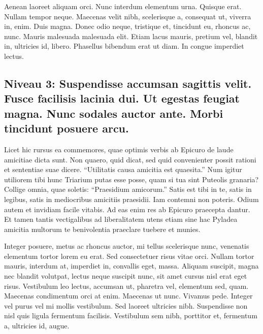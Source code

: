 \documentclass[twoside]{extreport}
\begin{document}
Aenean laoreet aliquam orci. Nunc interdum elementum urna. Quisque erat.
Nullam tempor neque. Maecenas velit nibh, scelerisque a, consequat ut,
viverra in, enim. Duis magna. Donec odio neque, tristique et, tincidunt
eu, rhoncus ac, nunc. Mauris malesuada malesuada elit. Etiam lacus
mauris, pretium vel, blandit in, ultricies id, libero. Phasellus
bibendum erat ut diam. In congue imperdiet lectus.

\hypertarget{niveau-3-suspendisse-accumsan-sagittis-velit.-fusce-facilisis-lacinia-dui.-ut-egestas-feugiat-magna.-nunc-sodales-auctor-ante.-morbi-tincidunt-posuere-arcu.}{%
\subsection*{Niveau 3: Suspendisse accumsan sagittis velit. Fusce
facilisis lacinia dui. Ut egestas feugiat magna. Nunc sodales auctor
ante. Morbi tincidunt posuere
arcu.}\label{niveau-3-suspendisse-accumsan-sagittis-velit.-fusce-facilisis-lacinia-dui.-ut-egestas-feugiat-magna.-nunc-sodales-auctor-ante.-morbi-tincidunt-posuere-arcu.}}

Licet hic rursus ea commemores, quae optimis verbis ab Epicuro de laude
amicitiae dicta sunt. Non quaero, quid dicat, sed quid convenienter
possit rationi et sententiae suae dicere. ``Utilitatis causa amicitia
est quaesita.'' Num igitur utiliorem tibi hunc Triarium putas esse
posse, quam si tua sint Puteolis granaria? Collige omnia, quae soletis:
``Praesidium amicorum.'' Satis est tibi in te, satis in legibus, satis
in mediocribus amicitiis praesidii. Iam contemni non poteris. Odium
autem et invidiam facile vitabis. Ad eas enim res ab Epicuro praecepta
dantur. Et tamen tantis vectigalibus ad liberalitatem utens etiam sine
hac Pyladea amicitia multorum te benivolentia praeclare tuebere et
munies.

Integer posuere, metus ac rhoncus auctor, mi tellus scelerisque nunc,
venenatis elementum tortor lorem eu erat. Sed consectetuer risus vitae
orci. Nullam tortor mauris, interdum at, imperdiet in, convallis eget,
massa. Aliquam suscipit, magna nec blandit volutpat, lectus neque
suscipit nunc, sit amet cursus nisl erat eget risus. Vestibulum leo
lectus, accumsan ut, pharetra vel, elementum sed, quam. Maecenas
condimentum orci at enim. Maecenas ut nunc. Vivamus pede. Integer vel
purus vel mi mollis vestibulum. Sed laoreet ultricies nibh. Suspendisse
non nisl quis ligula fermentum facilisis. Vestibulum sem nibh, porttitor
et, fermentum a, ultricies id, augue.
\end{document}
